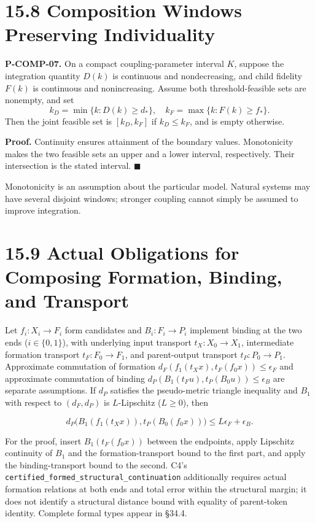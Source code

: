 \documentclass[
  english,
  11pt,
  oneside]{book}
\newcounter{none} %
\begin{document}
\section{15.8 Composition Windows Preserving Individuality}\label{composition-windows-preserving-individuality}

\hypertarget{p-comp-07}{}\label{p-comp-07}

\textbf{P-COMP-07.} On a compact coupling-parameter interval \(K\), suppose the integration quantity \(D(k)\) is continuous and nondecreasing, and child fidelity \(F(k)\) is continuous and nonincreasing. Assume both threshold-feasible sets are nonempty, and set \[k_D=\min\{k:D(k)\ge d_*\},\quad
k_F=\max\{k:F(k)\ge f_*\}.\] Then the joint feasible set is \([k_D,k_F]\) if \(k_D\le k_F\), and is empty otherwise.

\textbf{Proof.} Continuity ensures attainment of the boundary values. Monotonicity makes the two feasible sets an upper and a lower interval, respectively. Their intersection is the stated interval. \(\blacksquare\)

Monotonicity is an assumption about the particular model. Natural systems may have several disjoint windows; stronger coupling cannot simply be assumed to improve integration.

\section{15.9 Actual Obligations for Composing Formation, Binding, and Transport}\label{actual-obligations-for-composing-formation-binding-and-transport}

Let \(f_i:X_i\to F_i\) form candidates and \(B_i:F_i\to P_i\) implement binding at the two ends (\(i\in\{0,1\}\)), with underlying input transport \(t_X:X_0\to X_1\), intermediate formation transport \(t_F:F_0\to F_1\), and parent-output transport \(t_P:P_0\to P_1\). Approximate commutation of formation \(d_F(f_1(t_Xx),t_F(f_0x))\le\epsilon_F\) and approximate commutation of binding \(d_P(B_1(t_Fu),t_P(B_0u))\le\epsilon_B\) are separate assumptions. If \(d_P\) satisfies the pseudo-metric triangle inequality and \(B_1\) with respect to \((d_F,d_P)\) is \(L\)-Lipschitz (\(L\ge0\)), then

\[d_P\bigl(B_1(f_1(t_Xx)),t_P(B_0(f_0x))\bigr)\le L\epsilon_F+\epsilon_B.\]

For the proof, insert \(B_1(t_F(f_0x))\) between the endpoints, apply Lipschitz continuity of \(B_1\) and the formation-transport bound to the first part, and apply the binding-transport bound to the second. C4's \nolinkurl{certified_formed_structural_continuation} additionally requires actual formation relations at both ends and total error within the structural margin; it does not identify a structural distance bound with equality of parent-token identity. Complete formal types appear in §34.4.
\end{document}
